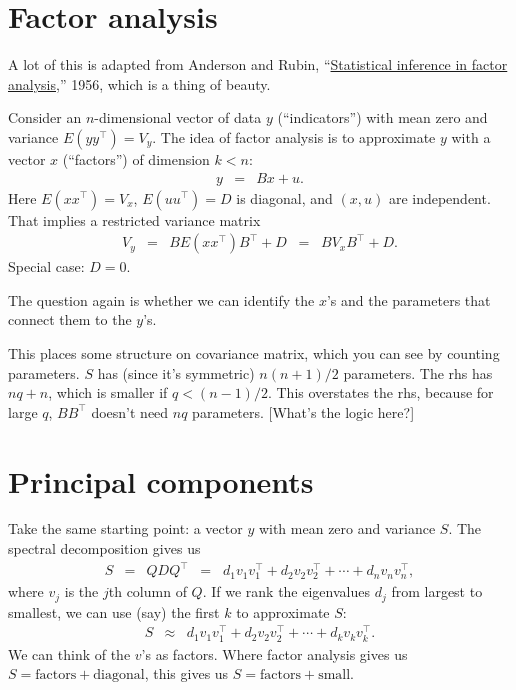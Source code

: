 \documentclass[11pt]{article}
\begin{document}
\section{Factor analysis}

A lot of this is adapted from Anderson and Rubin,
``\href{http://dido.wss.yale.edu/P/cp/p01a/p0103.pdf}
{Statistical inference in factor analysis},'' 1956,
which is a thing of beauty.

Consider an $n$-dimensional vector of data $y$ (``indicators'')
with mean zero and variance
$  E  ( y y^\top ) = V_y  $.
The idea of factor analysis is to approximate $y$
with a vector $x$ (``factors'') of dimension $k < n$:
\begin{eqnarray}
    y    &=& B x + u .
    \label{eq:factor-structure}
\end{eqnarray}
Here $ E(x x^\top) = V_x$,
$E (u u^\top) = D $ is diagonal,
and $(x,u)$ are independent.
That implies a restricted variance matrix
\begin{eqnarray}
    V_y  &=& B E ( x x^\top ) B^\top + D
            \;\;=\;\; B V_x B^\top + D .
    \label{eq:variance-factor-structure}
\end{eqnarray}
Special case:  $D = 0$.

The question again is whether we can identify the $x$'s
and the parameters that connect them to the $y$'s.

This places some structure on covariance matrix,
which you can see by counting parameters.
$S$ has (since it's symmetric) $ n(n+1)/2$ parameters.
The rhs has $nq + n$,
which is smaller if
$ q < (n-1)/2 $.
This overstates the rhs, because for large $q$,
$B B^\top$ doesn't need $nq$ parameters.
[What's the logic here?]



\section{Principal components}

Take the same starting point:  a vector $y$ with
mean zero and variance $S$.
The spectral decomposition gives us
\begin{eqnarray*}
    S &=& Q D Q^\top
        \;\;=\;\; d_1 v_1 v_1^\top + d_2 v_2 v_2^\top  + \cdots
            + d_n v_n v_n^\top ,
\end{eqnarray*}
where $v_j$ is the $j$th column of $Q$.
If we rank the eigenvalues $d_j$ from largest to smallest,
we can use (say) the first $k$ to approximate $S$:
\begin{eqnarray*}
    S  &\approx&  d_1 v_1 v_1^\top + d_2 v_2 v_2^\top  + \cdots
            + d_k v_k v_k^\top .
\end{eqnarray*}
We can think of the $v$'s as factors.
Where factor analysis gives us $S = \mbox{factors} + \mbox{diagonal}$,
this gives us
$S = \mbox{factors} + \mbox{small}$.
\end{document}
